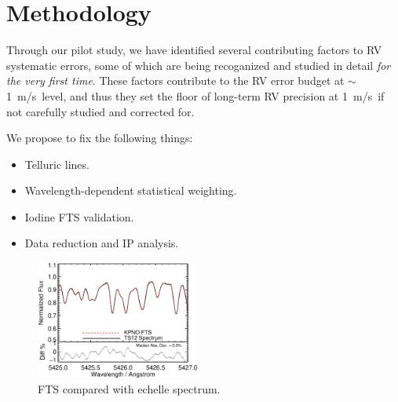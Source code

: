 \documentclass[12pt]{article}
\def\mps{m/s}
\begin{document}
\section{Methodology}

Through our pilot study, we have
identified several contributing factors to RV systematic errors,
some of which are being recoganized and studied in detail \textit{for the
very first time}. These factors contribute to the RV error budget at
$\sim$1~\mps\ level, and thus they set the floor of long-term RV
precision at 1~\mps\ if not carefully studied and corrected for.


We propose to fix the following things:
\begin{itemize}
  \item Telluric lines.
  \item Wavelength-dependent statistical weighting.
  \item Iodine FTS validation.
  \item Data reduction and IP analysis.
\end{itemize}



\begin{figure}
  \vspace{-35pt}
  \begin{center}
    \includegraphics[width=0.48\textwidth]{fts}
  \end{center}
  \vspace{-25pt}  
  \caption{FTS compared with echelle spectrum.}
  \vspace{-8pt}  
  \label{fts}
\end{figure}
\end{document}
